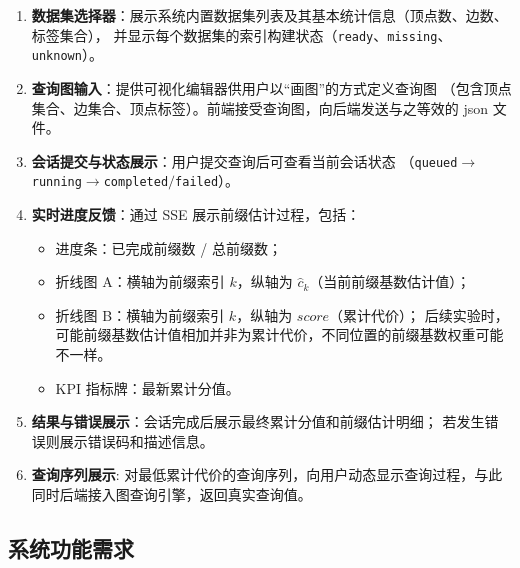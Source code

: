 \documentclass[12pt,a4paper]{article}
\begin{document}
\begin{enumerate}[label=\textbf{UI-\arabic*}]
  \item \textbf{数据集选择器}：展示系统内置数据集列表及其基本统计信息（顶点数、边数、标签集合），
        并显示每个数据集的索引构建状态（\texttt{ready}、\texttt{missing}、\texttt{unknown}）。

  \item \textbf{查询图输入}：提供可视化编辑器供用户以“画图”的方式定义查询图
        （包含顶点集合、边集合、顶点标签）。前端接受查询图，向后端发送与之等效的 json 文件。

  \item \textbf{会话提交与状态展示}：用户提交查询后可查看当前会话状态
        （\texttt{queued}$\to$\texttt{running}$\to$\texttt{completed}$/$\texttt{failed}）。

  \item \textbf{实时进度反馈}：通过 SSE 展示前缀估计过程，包括：
        \begin{itemize}
          \item 进度条：已完成前缀数 / 总前缀数；
          \item 折线图 A：横轴为前缀索引 $k$，纵轴为 $\hat{c}_k$（当前前缀基数估计值）；
          \item 折线图 B：横轴为前缀索引 $k$，纵轴为 $\mathit{score}$（累计代价）；
          后续实验时，可能前缀基数估计值相加并非为累计代价，不同位置的前缀基数权重可能不一样。
          \item KPI 指标牌：最新累计分值。
        \end{itemize}

  \item \textbf{结果与错误展示}：会话完成后展示最终累计分值和前缀估计明细；
        若发生错误则展示错误码和描述信息。

  \item \textbf{查询序列展示}: 对最低累计代价的查询序列，向用户动态显示查询过程，与此同时后端接入图查询引擎，返回真实查询值。
\end{enumerate}

\subsection{系统功能需求}
\end{document}
